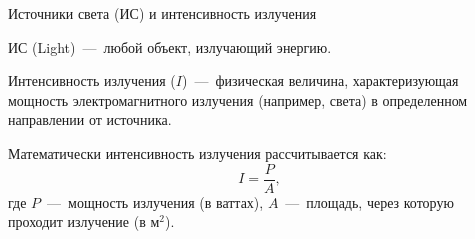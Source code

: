 \documentclass{beamer}
\begin{document}
	\begin{frame}{Источники света (ИС) и интенсивность излучения}

		ИС (Light)~---~любой объект, излучающий энергию. 

		Интенсивность излучения ($I$)~---~физическая величина, характеризующая мощность электромагнитного излучения (например, света) в определенном направлении от источника. 
		
		\vspace{1cm}

		Математически интенсивность излучения рассчитывается как:
		\[
			I= \frac{P}{A}
			,
		\]
		где
    $P$~---~мощность излучения (в ваттах),
    $A$~---~площадь, через которую проходит излучение (в м$^2$).
		
		

	\end{frame}
\end{document}
